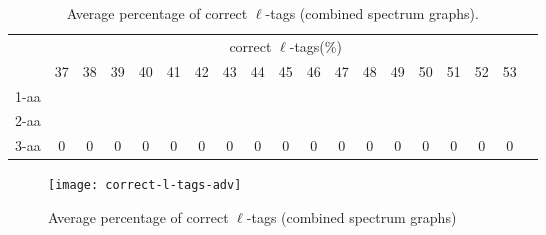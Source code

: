 \documentclass{article}[12pt]
\begin{document}
\begin{landscape}
\begin{table}[h]
\vspace{3mm}
\end{table}
\begin{table}[h]\tiny
\vspace{3mm}
{\centering
\begin{center}
\begin{tabular}{|l|c|c|c|c|c|c|c|c|c|c|c|c|c|c|c|c|c|c|}
  \hline
  & \multicolumn{ 17 }{|c|}{correct $\ell$-tags(\%)} \\
  \cline{2- 18}
    & 37 & 38 & 39 & 40 & 41 & 42 & 43 & 44 & 45 & 46 & 47 & 48 & 49 & 50 & 51 & 52 & 53\\
  \hline
1-aa  &  &  &  &  &  &  &  &  &  &  &  &  &  &  &  &  & \\
2-aa  &  &  &  &  &  &  &  &  &  &  &  &  &  &  &  &  & \\
3-aa  & 0 & 0 & 0 & 0 & 0 & 0 & 0 & 0 & 0 & 0 & 0 & 0 & 0 & 0 & 0 & 0 & 0\\
 \hline
\end{tabular}
\end{center}
\par}
\centering

\caption{ Average percentage of correct $\ell$-tags (combined spectrum graphs).}
\label{table:correct-l-tags-adv}

\vspace{3mm}
\end{table}
\end{landscape}

\begin{figure}
  \begin{center}
\texttt{[image: correct-l-tags-adv]}
\end{center}
\caption{Average percentage of correct $\ell$-tags (combined spectrum graphs)}
  \label{fig:correct-l-tags-adv}
\end{figure}
\end{document}

